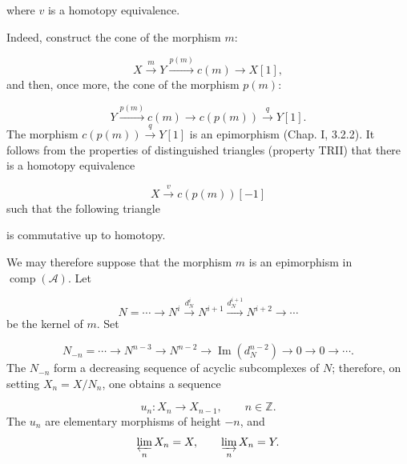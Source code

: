 \clearpage
{}%
\begingroup\small\setlength{\parskip}{0pt}\setlength{\emergencystretch}{1.5em}
\setlength{\abovedisplayskip}{4pt plus 2pt minus 2pt}%
\setlength{\belowdisplayskip}{4pt plus 2pt minus 2pt}%

where $v$ is a homotopy equivalence.

Indeed, construct the cone of the morphism $m$:

\[
X\xrightarrow{m}Y\xrightarrow{p(m)}c(m)
\longrightarrow X[1],
\]
and then, once more, the cone of the morphism $p(m)$:

\[
Y\xrightarrow{p(m)}c(m)\longrightarrow c(p(m))
\xrightarrow{q}Y[1].
\]
The morphism $c(p(m))\xrightarrow{q}Y[1]$ is an epimorphism
(Chap. I, 3.2.2). It follows from the properties of distinguished triangles
(property TRII) that there is a homotopy equivalence

\[
X\xrightarrow{v}c(p(m))[-1]
\]
such that the following triangle

\begin{center}
\end{center}
is commutative up to homotopy.

We may therefore suppose that the morphism $m$ is an epimorphism in
$\operatorname{comp}(\mathcal A)$. Let

\[
N=\cdots\longrightarrow N^i\xrightarrow{d_N^i}N^{i+1}
\xrightarrow{d_N^{i+1}}N^{i+2}\longrightarrow\cdots
\]
be the kernel of $m$. Set

\[
N_{-n}=\cdots\longrightarrow N^{n-3}\longrightarrow N^{n-2}
\longrightarrow\operatorname{Im}(d_N^{n-2})
\longrightarrow0\longrightarrow0\longrightarrow\cdots.
\]
The $N_{-n}$ form a decreasing sequence of acyclic subcomplexes of $N$;
therefore, on setting $X_n=X/N_n$, one obtains a sequence

\[
u_n\colon X_n\longrightarrow X_{n-1},\qquad n\in\mathbb Z.
\]
The $u_n$ are elementary morphisms of height $-n$, and
\[
\varprojlim_n X_n=X,
\qquad
\varinjlim_n X_n=Y.
\]
\endgroup
